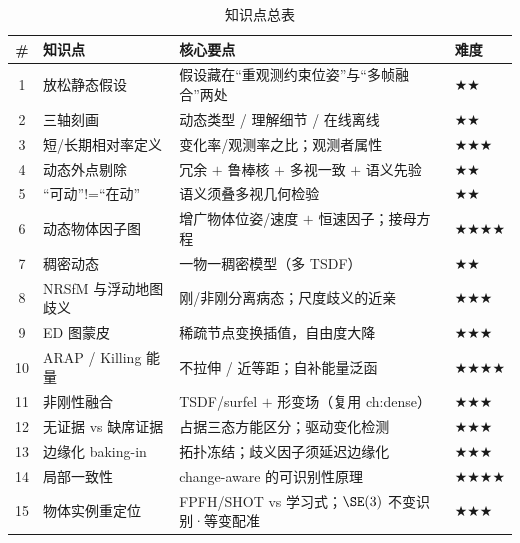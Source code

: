 \begin{table}[H]\centering\small
\caption{知识点总表}
\begin{tabular}{clll}
\toprule
\# & 知识点 & 核心要点 & 难度 \\
\midrule
1 & 放松静态假设 & 假设藏在“重观测约束位姿”与“多帧融合”两处 & $\bigstar\bigstar$ \\
2 & 三轴刻画 & 动态类型 / 理解细节 / 在线离线 & $\bigstar\bigstar$ \\
3 & 短/长期相对率定义 & 变化率/观测率之比；观测者属性 & $\bigstar\bigstar\bigstar$ \\
4 & 动态外点剔除 & 冗余 $+$ 鲁棒核 $+$ 多视一致 $+$ 语义先验 & $\bigstar\bigstar$ \\
5 & “可动”!=“在动” & 语义须叠多视几何检验 & $\bigstar\bigstar$ \\
6 & 动态物体因子图 & 增广物体位姿/速度 $+$ 恒速因子；接母方程 & $\bigstar\bigstar\bigstar\bigstar$ \\
7 & 稠密动态 & 一物一稠密模型（多 TSDF）& $\bigstar\bigstar$ \\
8 & NRSfM 与浮动地图歧义 & 刚/非刚分离病态；尺度歧义的近亲 & $\bigstar\bigstar\bigstar$ \\
9 & ED 图蒙皮 & 稀疏节点变换插值，自由度大降 & $\bigstar\bigstar\bigstar$ \\
10 & ARAP / Killing 能量 & 不拉伸 / 近等距；自补能量泛函 & $\bigstar\bigstar\bigstar\bigstar$ \\
11 & 非刚性融合 & TSDF/surfel $+$ 形变场（复用 ch:dense）& $\bigstar\bigstar\bigstar$ \\
12 & 无证据 vs 缺席证据 & 占据三态方能区分；驱动变化检测 & $\bigstar\bigstar\bigstar$ \\
13 & 边缘化 baking-in & 拓扑冻结；歧义因子须延迟边缘化 & $\bigstar\bigstar\bigstar$ \\
14 & 局部一致性 & change-aware 的可识别性原理 & $\bigstar\bigstar\bigstar\bigstar$ \\
15 & 物体实例重定位 & FPFH/SHOT vs 学习式；$\SE(3)$ 不变识别·等变配准 & $\bigstar\bigstar\bigstar$ \\
\bottomrule
\end{tabular}
\end{table}

